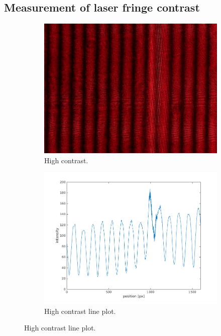 \documentclass[a4paper, 12pt]{paper}
\begin{document}
\subsection{Measurement of laser fringe contrast}

\begin{figure}[H]
    \begin{subfigure}[t]{0.40\textwidth}
        \includegraphics[width=\textwidth]{img/107}
        \caption{High contrast.}
    \end{subfigure}
    \begin{subfigure}[t]{0.45\textwidth}
        \includegraphics[width=\textwidth]{img/high_contrast_line}
        \caption{High contrast line plot.}

\end{subfigure}
\end{figure}
\end{document}
